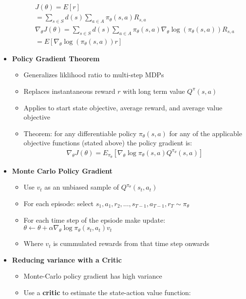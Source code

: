 \documentclass[12pt]{article}
\begin{document}
\begin{itemize}
\begin{itemize}
\begin{gather*}
      J(\theta) = E[r] \\
      = \sum\limits_{s \in S} d(s) \sum\limits_{a \in A} \pi_\theta(s, a) R_{s, a} \\
      \nabla_\theta J(\theta) = \sum\limits_{s \in S} d(s) \sum\limits_{a \in A} \pi_\theta(s,a) \nabla_\theta \log (\pi_\theta(s,a)) R_{s,a} \\
      = E[\nabla_\theta \log(\pi_\theta(s,a))r] 
    \end{gather*}
  \end{itemize}
  \item \textbf{Policy Gradient Theorem}
  \begin{itemize}
    \item Generalizes liklihood ratio to multi-step MDPs
    \item Replaces instantaneous reward $r$ with long term value $Q^\pi(s, a)$
    \item Applies to start state objective, average reward, and average value objective
    \item Theorem: for any differentiable policy $\pi_\theta(s, a)$ for any of the applicable
    objective functions (stated above) the policy gradient is:
    \begin{gather*}
      \nabla_\theta J(\theta) = E_{\pi_\theta}[\nabla_\theta \log \pi_\theta (s, a) Q^{\pi_\theta}(s,a)]
    \end{gather*}
  \end{itemize}
  \item \textbf{Monte Carlo Policy Gradient}
  \begin{itemize}
    \item Use $v_t$ as an unbiased sample of $Q^{\pi_\theta}(s_t, a_t)$
    \item For each episode: select ${s_1, a_1, r_2, \dots, s_{T-1}, a_{T-1}, r_T} \sim \pi_\theta$
    \item For each time step of the epsiode make update: $\theta \leftarrow \theta + \alpha \nabla_\theta \log \pi_\theta (s_t, a_t)v_t$
    \item Where $v_t$ is cummulated rewards from that time step onwards
  \end{itemize}
  \item \textbf{Reducing variance with a Critic}
  \begin{itemize}
    \item Monte-Carlo policy gradient has high variance
    \item Use a \textbf{critic} to estimate the state-action value function:
    \begin{gather*}

\end{gather*}
\end{itemize}
\end{itemize}
\end{document}
